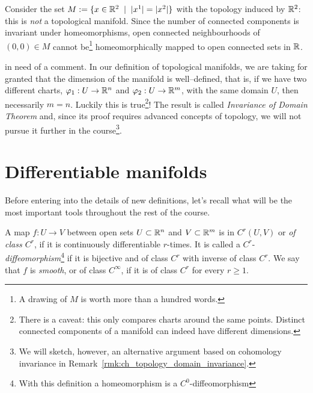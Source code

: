 \begin{example}
	Consider the set $M := \{ x\in\mathbb{R}^2 \;\mid\; |x^1| = |x^2| \}$ with the topology induced by $\mathbb{R}^2$:
	this is \emph{not} a topological manifold.
	Since the number of connected components is invariant under homeomorphisms, open connected neighbourhoods of $(0,0)\in M$ cannot be\footnote{A drawing of $M$ is worth more than a hundred words.} homeomorphically mapped to open connected sets in $\mathbb{R}$.
\end{example}

 in need of a comment.
In our definition of topological manifolds, we are taking for granted that the dimension of the manifold is well--defined, that is, if we have two different charts, $\varphi_1: U \to \mathbb{R}^n$ and $\varphi_2: U \to \mathbb{R}^m$, with the same domain $U$, then necessarily $m=n$. Luckily this is true\footnote{There is a caveat: this only compares charts around the same points. Distinct connected components of a manifold can indeed have different dimensions.}! The result is called \emph{Invariance of Domain Theorem} and, since its proof requires advanced concepts of topology, we will not pursue it further in the course\footnote{We will sketch, however, an alternative argument based on cohomology invariance in Remark~\ref{rmk:ch_topology_domain_invariance}.}.

\section{Differentiable manifolds}

Before entering into the details of new definitions, let's recall what will be the most important tools throughout the rest of the course.

\begin{definition}
	A map $f: U \to V$ between open sets $U\subset\mathbb{R}^n$ and $V\subset\mathbb{R}^m$ is in $C^r(U,V)$ or \emph{of class $C^r$}, if it is continuously differentiable $r$-times.
	It is called a $C^r$-\emph{diffeomorphism}\footnote{With this definition a homeomorphism is a $C^0$-diffeomorphism} if it is bijective and of class $C^r$ with inverse of class $C^r$.
	We say that $f$ is \emph{smooth}, or of class $C^\infty$, if it is of class $C^r$ for every $r \geq 1$.
\end{definition}

